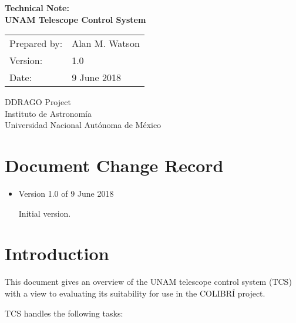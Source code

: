 \documentclass{article}
\begin{document}
\pagestyle{empty}

\begin{center}
\Large \bfseries 
Technical Note:\\
UNAM Telescope Control System
\end{center}

\begin{center}
\begin{tabular}{ll}
Prepared by:&Alan M. Watson\\
Version:&1.0\\
Date:&9 June 2018\\
\end{tabular}
\end{center}

\vspace{\fill}

\begin{center}
DDRAGO Project\\
Instituto de Astronomí­a\\
Universidad Nacional Autónoma de México
\end{center}

\newpage
\section*{Document Change Record}

\begin{itemize}

\item Version 1.0 of 9 June 2018

Initial version.
\end{itemize}

\newpage

\pagestyle{plain}

\tableofcontents
\newpage

\clearpage
\section{Introduction}

This document gives an overview of the UNAM telescope control system (TCS) with a view to evaluating its suitability for use in the COLIBRÍ project.

TCS handles the following tasks:
\end{document}
